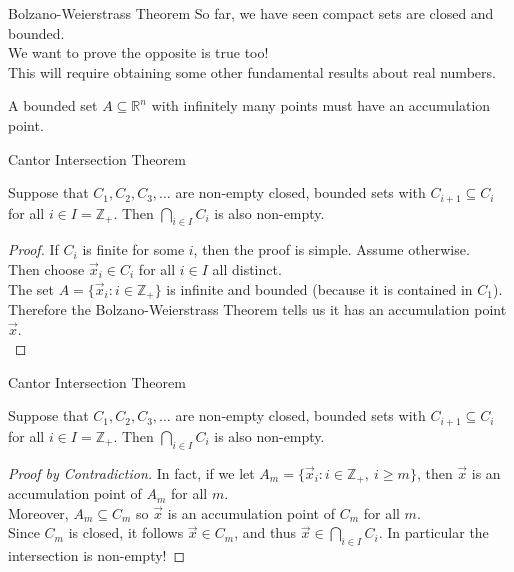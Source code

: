 \documentclass{beamer}
\begin{document}
\begin{frame}{Bolzano-Weierstrass Theorem}
So far, we have seen compact sets are closed and bounded.\\
\pause
We want to prove the opposite is true too!\\
\pause
This will require obtaining some other fundamental results about real numbers.
\pause
\begin{thm}
A bounded set $A\subseteq \mathbb{R}^n$ with infinitely many points must have an accumulation point.
\end{thm}
\end{frame}

\begin{frame}{Cantor Intersection Theorem}
\begin{thm}
Suppose that $C_1,C_2,C_3,\dots$ are non-empty closed, bounded sets with $C_{i+1}\subseteq C_i$ for all $i\in I = \mathbb{Z}_+$.
Then $\bigcap_{i\in I} C_i$ is also non-empty.
\end{thm}
\pause
\begin{proof}
\pause
If $C_i$ is finite for some $i$, then the proof is simple. Assume otherwise.\\
\pause
Then choose $\vec x_i\in C_i$ for all $i\in I$ all distinct.\\
\pause
The set $A = \{\vec x_i: i\in \mathbb{Z}_+\}$ is infinite and bounded (because it is contained in $C_1$).\\
\pause
Therefore the Bolzano-Weierstrass Theorem tells us it has an accumulation point $\vec x$.\\
\end{proof}
\end{frame}

\begin{frame}{Cantor Intersection Theorem}
\begin{thm}
Suppose that $C_1,C_2,C_3,\dots$ are non-empty closed, bounded sets with $C_{i+1}\subseteq C_i$ for all $i\in I = \mathbb{Z}_+$.
Then $\bigcap_{i\in I} C_i$ is also non-empty.
\end{thm}
\pause
\begin{proof}[Proof by Contradiction]
\pause
In fact, if we let $A_m = \{\vec x_i: i\in \mathbb{Z}_+,\ i\geq m\}$, then $\vec x$ is an accumulation point of $A_m$ for all $m$.\\
\pause
Moreover, $A_m\subseteq C_m$ so $\vec x$ is an accumulation point of $C_m$ for all $m$.\\
\pause
Since $C_m$ is closed, it follows $\vec x\in C_m$, and thus $\vec x\in \bigcap_{i\in I} C_i$.
\pause
In particular the intersection is non-empty!
\end{proof}
\end{frame}
\end{document}
